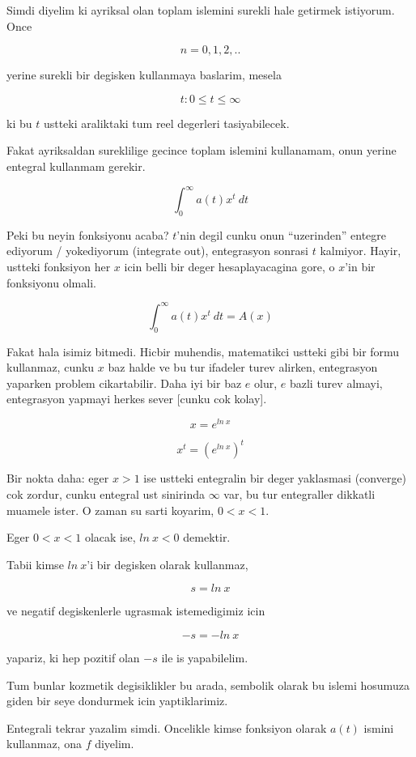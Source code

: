 \documentclass[12pt,fleqn]{article}
\begin{document}
Simdi diyelim ki ayriksal olan toplam islemini surekli hale getirmek
istiyorum. Once

\[ n = 0,1,2,.. \]

yerine surekli bir degisken kullanmaya baslarim, mesela

\[ t: 0 \le t \le \infty \]

ki bu $t$ ustteki araliktaki tum reel degerleri tasiyabilecek. 

Fakat ayriksaldan sureklilige gecince toplam islemini kullanamam, onun
yerine entegral kullanmam gerekir. 

\[ \int_0^{\infty} a(t)x^t \ dt \]

Peki bu neyin fonksiyonu acaba? $t$'nin degil cunku onun ``uzerinden''
entegre ediyorum / yokediyorum (integrate out), entegrasyon sonrasi $t$
kalmiyor. Hayir, ustteki fonksiyon her $x$ icin belli bir deger
hesaplayacagina gore, o $x$'in bir fonksiyonu olmali. 

\[ \int_0^{\infty} a(t)x^t \ dt = A(x)\]

Fakat hala isimiz bitmedi. Hicbir muhendis, matematikci ustteki gibi bir
formu kullanmaz, cunku $x$ baz halde ve bu tur ifadeler turev alirken,
entegrasyon yaparken problem cikartabilir. Daha iyi bir baz $e$ olur, $e$
bazli turev almayi, entegrasyon yapmayi herkes sever [cunku cok kolay]. 

\[ x = e^{ln \ x} \]

\[ x^t = (e^{ln \ x})^t \]

Bir nokta daha: eger $x > 1$ ise ustteki entegralin bir deger yaklasmasi
(converge) cok zordur, cunku entegral ust sinirinda $\infty$ var, bu tur
entegraller dikkatli muamele ister. O zaman su sarti koyarim, $0 < x < 1$. 

Eger  $0 < x < 1$ olacak ise, $ln \ x < 0$ demektir. 

Tabii kimse $ln \ x$'i bir degisken olarak kullanmaz, 

\[ s = ln \ x \]

ve negatif degiskenlerle ugrasmak istemedigimiz icin 

\[ -s = -ln \ x \] 

yapariz, ki hep pozitif olan $-s$ ile is yapabilelim. 

Tum bunlar kozmetik degisiklikler bu arada, sembolik olarak bu islemi
hosumuza giden bir seye dondurmek icin yaptiklarimiz. 

Entegrali tekrar yazalim simdi. Oncelikle kimse fonksiyon olarak $a(t)$
ismini kullanmaz, ona $f$ diyelim. 
\end{document}
